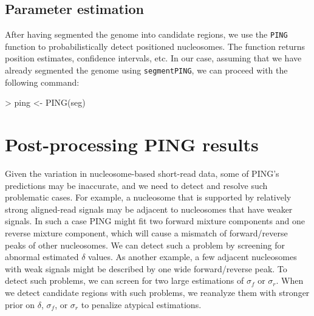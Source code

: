 \documentclass[11pt]{article}
\begin{document}
\subsection{Parameter estimation}
After having segmented the genome into candidate regions, we use the \texttt{PING} function to probabilistically detect positioned nucleosomes.
The function returns position estimates, confidence intervals, etc. %
In our case, assuming that we have already segmented the genome using \texttt{segmentPING}, we can proceed with the following command: 

\begin{Schunk}
\begin{Sinput}
> ping <- PING(seg)
\end{Sinput}
\end{Schunk}

%
%
%
%
%


\section{Post-processing PING results}
Given the variation in nucleosome-based short-read data, some of PING's predictions may be inaccurate, and we need to detect and resolve such problematic cases. 
For example, a nucleosome that is supported by relatively strong aligned-read signals may be adjacent to nucleosomes that have weaker signals. In such a case PING might fit two forward mixture components and one reverse mixture component, which will cause a mismatch of forward/reverse peaks of other nucleosomes. 
We can detect such a problem by screening for abnormal estimated $\delta$ values. As another example, a few adjacent nucleosomes with weak signals might be described by one wide forward/reverse peak. To detect such problems, we can screen for two large estimations of $\sigma_f$ or $\sigma_r$. When we detect candidate regions with such problems, we reanalyze them with stronger prior on $\delta$,  $\sigma_f$, or $\sigma_r$ to penalize atypical estimations.
\end{document}
